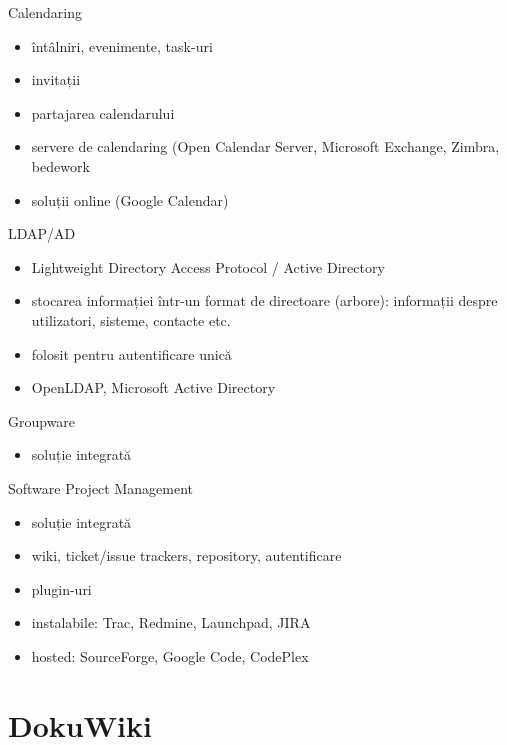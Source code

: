 \documentclass{beamer}
\begin{document}
\begin{frame}{Calendaring}
  \begin{itemize}
    \item întâlniri, evenimente, task-uri
    \item invitații
    \item partajarea calendarului
    \item servere de calendaring (Open Calendar Server, Microsoft Exchange,
    Zimbra, bedework
    \item soluții online (Google Calendar)
  \end{itemize}
\end{frame}

\begin{frame}{LDAP/AD}
  \begin{itemize}
    \item Lightweight Directory Access Protocol / Active Directory
    \item stocarea informației într-un format de directoare (arbore):
    informații despre utilizatori, sisteme, contacte etc.
    \item folosit pentru autentificare unică
    \item OpenLDAP, Microsoft Active Directory
  \end{itemize}
\end{frame}

\begin{frame}{Groupware}
  \begin{itemize}
    \item soluție integrată
  \end{itemize}
\end{frame}

\begin{frame}{Software Project Management}
  \begin{itemize}
    \item soluție integrată
    \item wiki, ticket/issue trackers, repository, autentificare
    \item plugin-uri
    \item instalabile: Trac, Redmine, Launchpad, JIRA
    \item hosted: SourceForge, Google Code, CodePlex
  \end{itemize}
\end{frame}

\section{DokuWiki}
\end{document}
